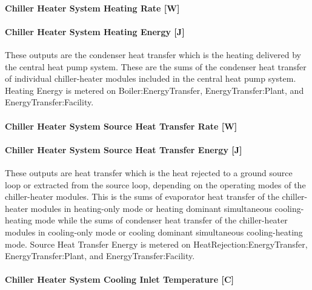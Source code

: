 \paragraph{Chiller Heater System Heating Rate {[}W{]}}\label{chiller-heater-system-heating-rate-w}

\paragraph{Chiller Heater System Heating Energy {[}J{]}}\label{chiller-heater-system-heating-energy-j}

These outputs are the condenser heat transfer which is the heating delivered by the central heat pump system. These are the sums of the condenser heat transfer of individual chiller-heater modules included in the central heat pump system. Heating Energy is metered on Boiler:EnergyTransfer, EnergyTransfer:Plant, and EnergyTransfer:Facility.

\paragraph{Chiller Heater System Source Heat Transfer Rate {[}W{]}}\label{chiller-heater-system-source-heat-transfer-rate-w}

\paragraph{Chiller Heater System Source Heat Transfer Energy {[}J{]}}\label{chiller-heater-system-source-heat-transfer-energy-j}

These outputs are heat transfer which is the heat rejected to a ground source loop or extracted from the source loop, depending on the operating modes of the chiller-heater modules. This is the sums of evaporator heat transfer of the chiller-heater modules in heating-only mode or heating dominant simultaneous cooling-heating mode while the sums of condenser heat transfer of the chiller-heater modules in cooling-only mode or cooling dominant simultaneous cooling-heating mode. Source Heat Transfer Energy is metered on HeatRejection:EnergyTransfer, EnergyTransfer:Plant, and EnergyTransfer:Facility.

\paragraph{Chiller Heater System Cooling Inlet Temperature {[}C{]}}\label{chiller-heater-system-cooling-inlet-temperature-c}

